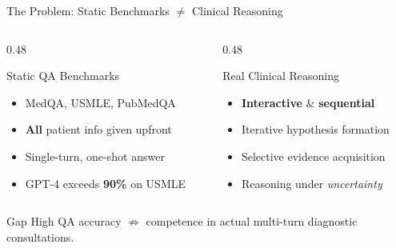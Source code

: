 \documentclass[aspectratio=169,11pt]{beamer}
\begin{document}
\begin{frame}{The Problem: Static Benchmarks $\neq$ Clinical Reasoning}
\begin{columns}[T]
\begin{column}{0.48\textwidth}
\begin{block}{Static QA Benchmarks}
\begin{itemize}
  \item MedQA, USMLE, PubMedQA
  \item \textbf{All} patient info given upfront
  \item Single-turn, one-shot answer
  \item GPT-4 exceeds \textbf{90\%} on USMLE
\end{itemize}
\end{block}
\end{column}
\begin{column}{0.48\textwidth}
\begin{block}{Real Clinical Reasoning}
\begin{itemize}
  \item \textbf{Interactive} \& \textbf{sequential}
  \item Iterative hypothesis formation
  \item Selective evidence acquisition
  \item Reasoning under \textit{uncertainty}
\end{itemize}
\end{block}
\end{column}
\end{columns}
\vspace{0.5em}
\begin{alertblock}{Gap}
High QA accuracy $\not\Rightarrow$ competence in actual multi-turn diagnostic consultations.
\end{alertblock}

\end{frame}
\end{document}
